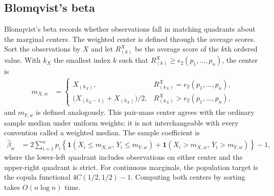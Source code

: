 \subsection{Blomqvist's beta}

Blomqvist's beta \citep{blomqvist1950} records whether observations fall in
matching quadrants about the marginal centers. The weighted center is defined
through the average scores. Sort the observations by $X$ and let
$R_{(k)}^X$ be the average score of the $k$th ordered value. With $k_X$ the
smallest index $k$ such that $R_{(k)}^X\geq e_2(p_1,\ldots,p_n)$, the center
is
\begin{align*}
    m_{X,w}
    &=
    \begin{cases}
        X_{(k_X)},
        & R_{(k_X)}^X = e_2(p_1,\ldots,p_n),\\
        \bigl(X_{(k_X-1)}+X_{(k_X)}\bigr)/2,
        & R_{(k_X)}^X > e_2(p_1,\ldots,p_n),
    \end{cases}
\end{align*}
and $m_{Y,w}$ is defined analogously. This pair-mass center agrees with the
ordinary sample median under uniform weights; it is not interchangeable with
every convention called a weighted median. The sample coefficient is
\begin{align*}
    \widehat\beta_w
    &= 2\sum_{i=1}^n p_i
       \left\{
         \mathbf{1}(X_i\leq m_{X,w},\,Y_i\leq m_{Y,w})
         +
         \mathbf{1}(X_i>m_{X,w},\,Y_i>m_{Y,w})
       \right\}-1,
\end{align*}
where the lower-left quadrant includes observations on either center and the
upper-right quadrant is strict. For continuous marginals, the population
target is the copula functional $4C(1/2,1/2)-1$. Computing both centers by
sorting takes $O(n\log n)$ time.
